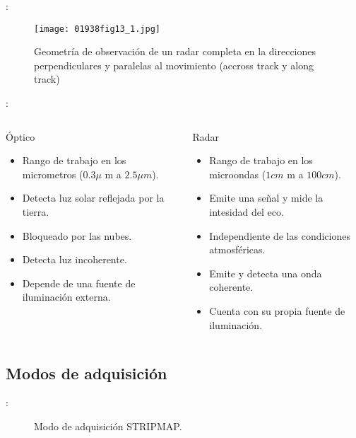 \begin{frame}{\secname : \subsecname}
  \begin{figure}
    \centering
    \texttt{[image: 01938fig13\_1.jpg]}
    \caption{Geometría de observación de un radar completa en la direcciones perpendiculares y paralelas al movimiento (accross track y along track)}
    \label{}
  \end{figure}
\end{frame}

\begin{frame}{\secname : \subsecname}
\begin{columns}
  \begin{column}{0.5\textwidth}
   \begin{block}{Óptico}
     \begin{itemize}
       \item Rango de trabajo en los micrometros ($0.3\mu$ m a $2.5\mu m$).
       \item Detecta luz solar reflejada por la tierra.
       \item Bloqueado por las nubes.
       \item Detecta luz incoherente.
       \item Depende de una fuente de iluminación externa.
     \end{itemize}
   \end{block}
  \end{column}
  \begin{column}{0.5\textwidth}  %
    \begin{block}{Radar}
      \begin{itemize}
        \item Rango de trabajo en los microondas ($1cm$ m a $100cm$).
        \item Emite una señal y mide la intesidad del eco.
        \item Independiente de las condiciones atmosféricas.
        \item Emite y detecta una onda coherente.
        \item Cuenta con su propia fuente de iluminación.
      \end{itemize}
    \end{block}
  \end{column}
  \end{columns}
\end{frame}

\subsection{Modos de adquisición}
\begin{frame}{\secname : \subsecname}
  \begin{figure}
    \centering
    \caption{Modo de adquisición STRIPMAP.}
    \label{}
  \end{figure}
\end{frame}

